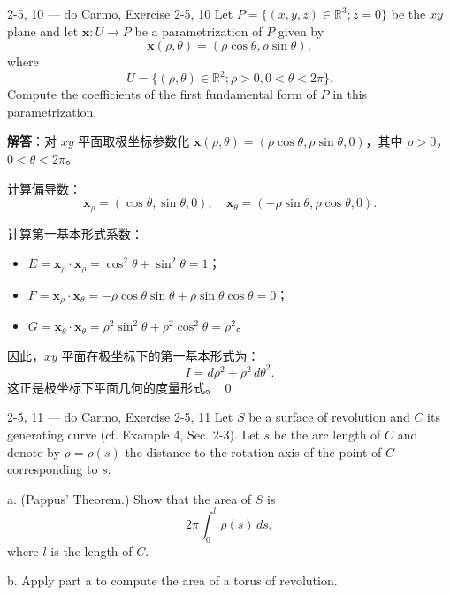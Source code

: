 \begin{exercise}{2-5, 10 — do Carmo, Exercise 2-5, 10}
Let $P = \{(x, y, z) \in \mathbb{R}^3; z = 0\}$ be the $xy$ plane and let $\mathbf{x}: U \to P$ be a parametrization of $P$ given by
\[
\mathbf{x}(\rho, \theta) = (\rho \cos \theta, \rho \sin \theta),
\]
where
\[
U = \{(\rho, \theta) \in \mathbb{R}^2; \rho > 0, 0 < \theta < 2\pi\}.
\]
Compute the coefficients of the first fundamental form of $P$ in this parametrization.
\end{exercise}

\begin{solution}
\textbf{解答}：对 $xy$ 平面取极坐标参数化 $\mathbf{x}(\rho, \theta) = (\rho\cos\theta, \rho\sin\theta, 0)$，其中 $\rho > 0$，$0 < \theta < 2\pi$。

计算偏导数：
\[
\mathbf{x}_\rho = (\cos\theta, \sin\theta, 0),\quad
\mathbf{x}_\theta = (-\rho\sin\theta, \rho\cos\theta, 0).
\]

计算第一基本形式系数：
\begin{itemize}
    \item $E = \mathbf{x}_\rho \cdot \mathbf{x}_\rho = \cos^2\theta + \sin^2\theta = 1$；
    \item $F = \mathbf{x}_\rho \cdot \mathbf{x}_\theta = -\rho\cos\theta\sin\theta + \rho\sin\theta\cos\theta = 0$；
    \item $G = \mathbf{x}_\theta \cdot \mathbf{x}_\theta = \rho^2\sin^2\theta + \rho^2\cos^2\theta = \rho^2$。
\end{itemize}

因此，$xy$ 平面在极坐标下的第一基本形式为：
\[
I = d\rho^2 + \rho^2\, d\theta^2.
\]
这正是极坐标下平面几何的度量形式。
\qed
\end{solution}

\begin{exercise}{2-5, 11 — do Carmo, Exercise 2-5, 11}
Let $S$ be a surface of revolution and $C$ its generating curve (cf. Example 4, Sec. 2-3). Let $s$ be the arc length of $C$ and denote by $\rho = \rho(s)$ the distance to the rotation axis of the point of $C$ corresponding to $s$.

a. (Pappus' Theorem.) Show that the area of $S$ is
\[
2\pi \int_0^l \rho(s) \, ds,
\]
where $l$ is the length of $C$.

b. Apply part a to compute the area of a torus of revolution.
\end{exercise}

